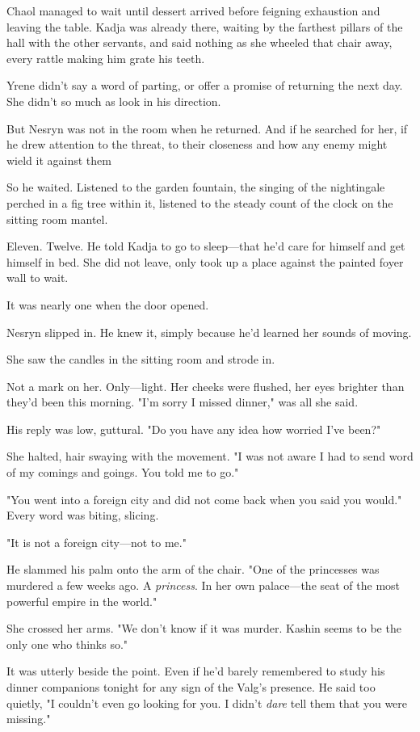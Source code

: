 Chaol managed to wait until dessert arrived before feigning exhaustion and leaving the table.
Kadja was already there, waiting by the farthest pillars of the hall with the other servants, and said nothing as she wheeled that chair away, every rattle making him grate his teeth.

Yrene didn't say a word of parting, or offer a promise of returning the next day.
She didn't so much as look in his direction.

But Nesryn was not in the room when he returned.
And if he searched for her, if he drew attention to the threat, to their closeness and how any enemy might wield it against them 

So he waited.
Listened to the garden fountain, the singing of the nightingale perched in a fig tree within it, listened to the steady count of the clock on the sitting room mantel.

Eleven.
Twelve.
He told Kadja to go to sleep---that he'd care for himself and get himself in bed.
She did not leave, only took up a place against the painted foyer wall to wait.

It was nearly one when the door opened.

Nesryn slipped in.
He knew it, simply because he'd learned her sounds of moving.

She saw the candles in the sitting room and strode in.

Not a mark on her.
Only---light.
Her cheeks were flushed, her eyes brighter than they'd been this morning.
"I'm sorry I missed dinner," was all she said.

His reply was low, guttural.
"Do you have any idea how worried I've been?"

She halted, hair swaying with the movement.
"I was not aware I had to send word of my comings and goings.
You told me to go."

"You went into a foreign city and did not come back when you said you would."
Every word was biting, slicing.

"It is not a foreign city---not to me."

He slammed his palm onto the arm of the chair.
"One of the princesses was murdered a few weeks ago.
A \emph{princess}.
In her own palace---the seat of the most powerful empire in the world."

She crossed her arms.
"We don't know if it was murder.
Kashin seems to be the only one who thinks so."

It was utterly beside the point.
Even if he'd barely remembered to study his dinner companions tonight for any sign of the Valg's presence.
He said too quietly, "I couldn't even go looking for you.
I didn't \emph{dare} tell them that you were missing."

